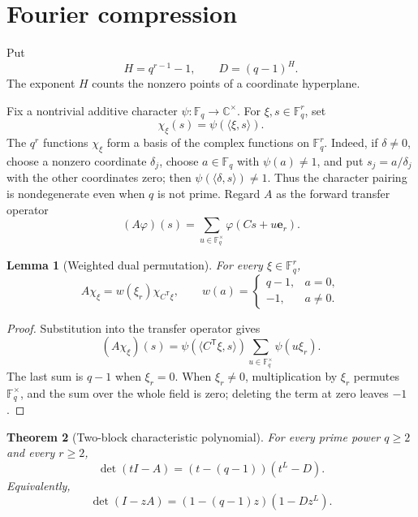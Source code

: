 \documentclass[11pt,a4paper]{amsart}
\newtheorem{theorem}{Theorem}[section]
\newtheorem{lemma}[theorem]{Lemma}
\theoremstyle{definition}
\theoremstyle{remark}
\newcommand{\F}{\mathbb F}
\begin{document}
\section{Fourier compression}
\label{sec:fourier}

Put
\begin{equation}\label{eq:parameters}
 H=q^{r-1}-1,
 \qquad
 D=(q-1)^H.
\end{equation}
The exponent $H$ counts the nonzero points of a coordinate hyperplane.

Fix a nontrivial additive character $\psi\colon\F_q\to\mathbb C^\times$.
For $\xi,s\in\F_q^r$, set
\[
 \chi_\xi(s)=\psi(\langle\xi,s\rangle).
\]
The $q^r$ functions $\chi_\xi$ form a basis of the complex functions on
$\F_q^r$.  Indeed, if $\delta\ne0$, choose a nonzero coordinate
$\delta_j$, choose $a\in\F_q$ with $\psi(a)\ne1$, and put
$s_j=a/\delta_j$ with the other coordinates zero; then
$\psi(\langle\delta,s\rangle)\ne1$.  Thus the character pairing is
nondegenerate even when $q$ is not prime.  Regard $A$ as the forward transfer operator
\[
 (A\varphi)(s)=\sum_{u\in\F_q^\times}\varphi(Cs+u\mathbf e_r).
\]

\begin{lemma}[Weighted dual permutation]
\label{lem:fourier-action}
For every $\xi\in\F_q^r$,
\begin{equation}\label{eq:fourier-action}
 A\chi_\xi=w(\xi_r)\chi_{C^{\mathsf T}\xi},
 \qquad
 w(a)=
 \begin{cases}
  q-1,&a=0,\\
  -1,&a\ne0.
 \end{cases}
\end{equation}
\end{lemma}

\begin{proof}
Substitution into the transfer operator gives
\[
 (A\chi_\xi)(s)
 =\psi(\langle C^{\mathsf T}\xi,s\rangle)
   \sum_{u\in\F_q^\times}\psi(u\xi_r).
\]
The last sum is $q-1$ when $\xi_r=0$.  When $\xi_r\ne0$, multiplication by
$\xi_r$ permutes $\F_q^\times$, and the sum over the whole field is zero;
deleting the term at zero leaves $-1$.
\end{proof}

\begin{theorem}[Two-block characteristic polynomial]
\label{thm:charpoly}
For every prime power $q\geq2$ and every $r\geq2$,
\begin{equation}\label{eq:charpoly}
 \boxed{\det(tI-A)=(t-(q-1))(t^L-D).}
\end{equation}
Equivalently,
\begin{equation}\label{eq:zeta-determinant}
 \det(I-zA)=(1-(q-1)z)(1-Dz^L).
\end{equation}
\end{theorem}
\end{document}
